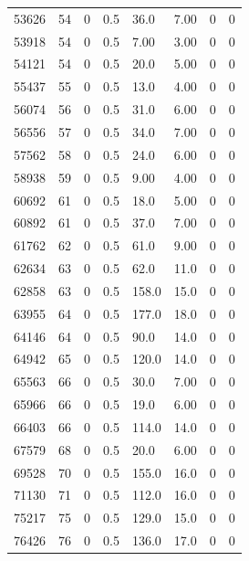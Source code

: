 \documentclass[preview]{standalone}
\begin{document}
{{{{\begin{tabular}{L{1.2cm}C{1.2cm} C{0.3cm}C{0.5cm} C{1.4cm}C{1.4cm} C{1.4cm}C{1.4cm}}
  53626  &    54  & 0     & 0.5 &  36.0  & 7.00  & 0 &  0   \\ 
  53918  &    54  & 0     & 0.5 &  7.00  & 3.00  & 0 &  0   \\ 
  54121  &    54  & 0     & 0.5 &  20.0  & 5.00  & 0 &  0   \\ 
  55437  &    55  & 0     & 0.5 &  13.0  & 4.00  & 0 &  0   \\ 
  56074  &    56  & 0     & 0.5 &  31.0  & 6.00  & 0 &  0   \\ 
  56556  &    57  & 0     & 0.5 &  34.0  & 7.00  & 0 &  0   \\ 
  57562  &    58  & 0     & 0.5 &  24.0  & 6.00  & 0 &  0   \\ 
  58938  &    59  & 0     & 0.5 &  9.00  & 4.00  & 0 &  0   \\ 
  60692  &    61  & 0     & 0.5 &  18.0  & 5.00  & 0 &  0   \\ 
  60892  &    61  & 0     & 0.5 &  37.0  & 7.00  & 0 &  0   \\ 
  61762  &    62  & 0     & 0.5 &  61.0  & 9.00  & 0 &  0   \\ 
  62634  &    63  & 0     & 0.5 &  62.0  & 11.0  & 0 &  0   \\ 
  62858  &    63  & 0     & 0.5 &  158.0  & 15.0  & 0 &  0   \\ 
  63955  &    64  & 0     & 0.5 &  177.0  & 18.0  & 0 &  0   \\ 
  64146  &    64  & 0     & 0.5 &  90.0  & 14.0  & 0 &  0   \\ 
  64942  &    65  & 0     & 0.5 &  120.0  & 14.0  & 0 &  0   \\ 
  65563  &    66  & 0     & 0.5 &  30.0  & 7.00  & 0 &  0   \\ 
  65966  &    66  & 0     & 0.5 &  19.0  & 6.00  & 0 &  0   \\ 
  66403  &    66  & 0     & 0.5 &  114.0  & 14.0  & 0 &  0   \\ 
  67579  &    68  & 0     & 0.5 &  20.0  & 6.00  & 0 &  0   \\ 
  69528  &    70  & 0     & 0.5 &  155.0  & 16.0  & 0 &  0   \\ 
  71130  &    71  & 0     & 0.5 &  112.0  & 16.0  & 0 &  0   \\ 
  75217  &    75  & 0     & 0.5 &  129.0  & 15.0  & 0 &  0   \\ 
  76426  &    76  & 0     & 0.5 &  136.0  & 17.0  & 0 &  0   \\ 
\hline 
\end{tabular} 

}}}}
\end{document}
